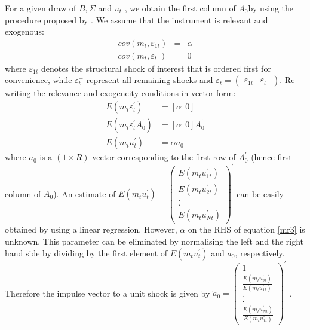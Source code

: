 \documentclass[a4paper,12pt]{article}%
\begin{document}
\label{App:IV} For a given draw of $B,\Sigma $ and $u_{t}$%
, we obtain the first column of $A_{0}$by using the
procedure proposed by \cite{MR:2013}. We
assume that the instrument is relevant and exogenous: %
\begin{eqnarray*}
cov\left( m_{t},\varepsilon _{1t}\right)  &=&\alpha  \\
cov\left( m_{t},\varepsilon _{t}^{-}\right)  &=&0
\end{eqnarray*}%
where $\varepsilon _{1t}$ denotes the structural shock of
interest that is ordered first for convenience, while $\varepsilon _{t}^{-}$%
 represent all remaining shocks and $\varepsilon _{t}=\left( 
\begin{array}{cc}
\varepsilon _{1t} & \varepsilon _{t}^{-}%
\end{array}%
\right) $. Re-writing the relevance and exogeneity conditions in
vector form: %
\begin{align}
E(m_{t}\varepsilon _{t}^{\prime })& =[\alpha \ \ 0]  \label{mr1} \\
E(m_{t}\varepsilon _{t}^{\prime }A_{0}^{\prime })& =[\alpha \ \
0]A_{0}^{\prime }  \label{mr2} \\
E(m_{t}u_{t}^{\prime })& =\alpha a_{0}  \label{mr3}
\end{align}%
where $a_{0}$ is a $(1\times R)$ vector
corresponding to the first row of $A_{0}^{\prime }$ (hence first
column of $A_{0}$). An estimate of $E(m_{t}u_{t}^{\prime })=\left( 
\begin{array}{c}
E(m_{t}u_{1t}^{\prime }) \\ 
E(m_{t}u_{2t}^{\prime }) \\ 
. \\ 
. \\ 
E(m_{t}u_{Nt}^{\prime })%
\end{array}%
\right) ^{\prime }$ can be easily obtained by using a linear
regression. However, $\alpha $ on the RHS of equation \ref{mr3} is
unknown. This parameter can be eliminated by normalising the left and the
right hand side by dividing by the first element of $E(m_{t}u_{t}^{\prime })
$ and $a_{0}$, respectively. Therefore the impulse vector
to a unit shock is given by $\tilde{a}_{0}=\left( 
\begin{array}{c}
1 \\ 
\frac{E(m_{t}u_{2t}^{\prime })}{E(m_{t}u_{1t}^{\prime })} \\ 
. \\ 
. \\ 
\frac{E(m_{t}u_{Nt}^{\prime })}{E(m_{t}u_{1t}^{\prime })}%
\end{array}%
\right) ^{\prime }$ . 
\end{document}
